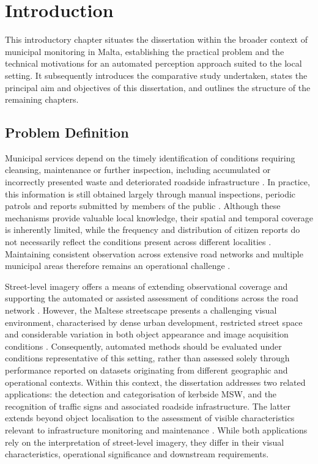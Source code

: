 \chapter{Introduction}
\label{ch:introduction}
\glsresetall
This introductory chapter situates the dissertation within the broader context of municipal monitoring in Malta, establishing the practical problem and the technical motivations for an automated perception approach suited to the local setting. It subsequently introduces the comparative study undertaken, states the principal aim and objectives of this dissertation, and outlines the structure of the remaining chapters.

\section{Problem Definition}
\label{sec:problem-definition}
Municipal services depend on the timely identification of conditions requiring cleansing, maintenance or further inspection, including accumulated or incorrectly presented waste and deteriorated roadside infrastructure \cite{I1,I2,I3,I4}. In practice, this information is still obtained largely through manual inspections, periodic patrols and reports submitted by members of the public \cite{BG1-repeatedinspection,BG4-human-inspection,BG2-waste-reporting}. Although these mechanisms provide valuable local knowledge, their spatial and temporal coverage is inherently limited, while the frequency and distribution of citizen reports do not necessarily reflect the conditions present across different localities \cite{BG3-citizen-reporting,BG6-reporting-bias}. Maintaining consistent observation across extensive road networks and multiple municipal areas therefore remains an operational challenge \cite{urbanproblem,BG7-driveby-sensing}.

Street-level imagery offers a means of extending observational coverage and supporting the automated or assisted assessment of conditions across the road network \cite{ashraf2026urbaninfrastructure}. However, the Maltese streetscape presents a challenging visual environment, characterised by dense urban development, restricted street space and considerable variation in both object appearance and image acquisition conditions \cite{I5-malta,I6-malta,BG15-mdwd}. Consequently, automated methods should be evaluated under conditions representative of this setting, rather than assessed solely through performance reported on datasets originating from different geographic and operational contexts. Within this context, the dissertation addresses two related applications: the detection and categorisation of kerbside \gls{MSW}, and the recognition of traffic signs and associated roadside infrastructure. The latter extends beyond object localisation to the assessment of visible characteristics relevant to infrastructure monitoring and maintenance \cite{BG5-sign-monitoring,BG29-sign-inspection,BG30-sign-visual-condition}. While both applications rely on the interpretation of street-level imagery, they differ in their visual characteristics, operational significance and downstream requirements.

